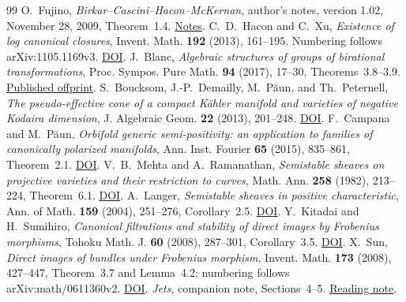 \documentclass[12pt,a4paper,psamsfonts]{amsart}
\theoremstyle{definition}
\theoremstyle{plain}
\begin{document}
\begin{thebibliography}{99}
O.~Fujino,
\emph{Birkar--Cascini--Hacon--McKernan},
author's notes, version 1.02, November 28, 2009, Theorem~1.4.
\href{https://www.math.kyoto-u.ac.jp/~fujino/BCHM01.pdf}{Notes}.
C.~D.~Hacon and C.~Xu,
\emph{Existence of log canonical closures},
Invent. Math. \textbf{192} (2013), 161--195.
Numbering follows arXiv:1105.1169v3.
\href{https://doi.org/10.1007/s00222-012-0409-0}{DOI}.
J.~Blanc,
\emph{Algebraic structures of groups of birational transformations},
Proc. Sympos. Pure Math. \textbf{94} (2017), 17--30,
Theorems~3.8--3.9.
\href{https://algebra.dmi.unibas.ch/blanc/articles/structurebir.pdf}{Published offprint}.
S.~Boucksom, J.-P.~Demailly, M.~P\u{a}un, and Th.~Peternell,
\emph{The pseudo-effective cone of a compact K\"ahler manifold and
varieties of negative Kodaira dimension},
J. Algebraic Geom. \textbf{22} (2013), 201--248.
\href{https://doi.org/10.1090/S1056-3911-2012-00574-8}{DOI}.
F.~Campana and M.~P\u{a}un,
\emph{Orbifold generic semi-positivity: an application to families
of canonically polarized manifolds},
Ann. Inst. Fourier \textbf{65} (2015), 835--861, Theorem~2.1.
\href{https://doi.org/10.5802/aif.2945}{DOI}.
V.~B.~Mehta and A.~Ramanathan,
\emph{Semistable sheaves on projective varieties and their
restriction to curves},
Math. Ann. \textbf{258} (1982), 213--224, Theorem~6.1.
\href{https://doi.org/10.1007/BF01450677}{DOI}.
A.~Langer,
\emph{Semistable sheaves in positive characteristic},
Ann. of Math. \textbf{159} (2004), 251--276, Corollary~2.5.
\href{https://doi.org/10.4007/annals.2004.159.251}{DOI}.
Y.~Kitadai and H.~Sumihiro,
\emph{Canonical filtrations and stability of direct images by
Frobenius morphisms},
Tohoku Math. J. \textbf{60} (2008), 287--301, Corollary~3.5.
\href{https://doi.org/10.2748/tmj/1215442876}{DOI}.
X.~Sun,
\emph{Direct images of bundles under Frobenius morphism},
Invent. Math. \textbf{173} (2008), 427--447,
Theorem~3.7 and Lemma~4.2; numbering follows
arXiv:math/0611360v2.
\href{https://doi.org/10.1007/s00222-008-0125-y}{DOI}.
\emph{Jets}, companion note, Sections~4--5.
\href{https://birationalclass.github.io/shengmeng/study/abundance/jets.html}{Reading note}.
\end{thebibliography}
\end{document}
